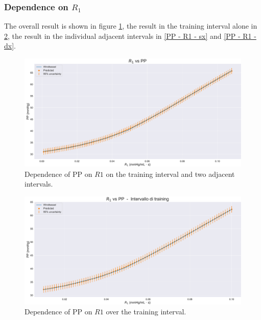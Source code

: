 \newpage
\subsubsection{Dependence on $R_1$}
The overall result is shown in figure \ref{PP - R1 - full}, the result in the training interval alone in \ref{PP - R1 - training}, the result in the individual adjacent intervals in \ref{PP - R1 - sx} and \ref{PP - R1 - dx}.

\vspace{1cm}

\begin{figure}[!htb]
    \centering
    \includegraphics[width=1\textwidth]{images/Training (risultati)/PP/PP - R1 - full.pdf}
    \caption{Dependence of PP on $R1$ on the training interval and two adjacent intervals.}
    \label{PP - R1 - full}
\end{figure}

\vspace{0.32cm}

\begin{figure}[!htb]
    \centering
    \includegraphics[width=1\textwidth]{images/Training (risultati)/PP/PP - R1 - training.pdf}
    \caption{Dependence of PP on $R1$ over the training interval.}
    \label{PP - R1 - training}
\end{figure}

